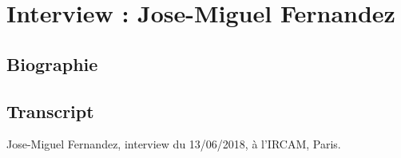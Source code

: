 \chapter{Interview : Jose-Miguel Fernandez}
\label{appendix:fernandez}

\section*{Biographie}


\section*{Transcript}

Jose-Miguel Fernandez, interview du 13/06/2018, à l'IRCAM, Paris.
